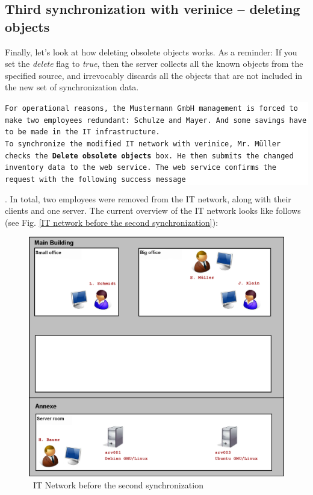 \documentclass[a4paper,10pt]{book}
\begin{document}
\subsection{ Third synchronization with verinice – deleting objects}
Finally, let's look at how deleting obsolete objects works. As a reminder: If you set the \textit{delete} flag to \textit{true}, then
the server collects all the known objects from the specified source, and irrevocably discards all the objects that are not included
in the new set of synchronization data.
\newline
\newline
\colorbox{white}{\parbox{\textwidth}{
{\tt For operational reasons, the Mustermann GmbH management is forced to make two employees redundant: Schulze and Mayer. And some
savings have to be made in the IT infrastructure.
\newline\\
To synchronize the modified IT network with verinice, Mr. Müller checks the \textbf{Delete obsolete objects} box. He then submits the
changed inventory data to the web service. The web service confirms the request with the following success message}}}.
\newline
\newline
In total, two employees were removed from the IT network, along with their clients and one server. The current overview of the IT network
looks like follows (see Fig. \ref{IT network before the second synchronization}):
\newline
\begin{figure}[htb!]
  \centering
  \includegraphics[scale=.21]{Screenshot/Mustermann_snapshot03_03-en.png}
  \caption{\label{IT Network before the second synchronization} \ IT Network before the second synchronization}
\end{figure}
\end{document}
